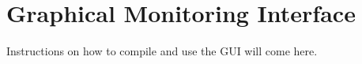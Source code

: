 \section{Graphical Monitoring Interface}

Instructions on how to compile and use the GUI will come here.
